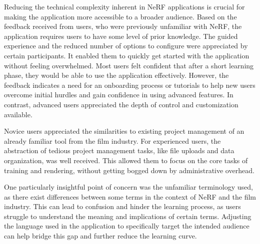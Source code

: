 Reducing the technical complexity inherent in NeRF applications is crucial for making the application more accessible to a broader audience.
Based on the feedback received from users, who were previously unfamiliar with NeRF, the application requires users to have some level of prior knowledge.
The guided experience and the reduced number of options to configure were appreciated by certain participants.
It enabled them to quickly get started with the application without feeling overwhelmed.
Most users felt confident that after a short learning phase, they would be able to use the application effectively.
\cite{P2, P3, P4, P5, P6, P7, P8}
However, the feedback indicates a need for an onboarding process or tutorials to help new users overcome initial hurdles and gain confidence in using advanced features.
In contrast, advanced users appreciated the depth of control and customization available.
\cite{P9, P10}


Novice users appreciated the similarities to existing project management of an already familiar tool from the film industry. 
\cite{P5}
For experienced users, the abstraction of tedious project management tasks, like file uploads and data organization, was well received.
\cite{P1}
This allowed them to focus on the core tasks of training and rendering, without getting bogged down by administrative overhead.


One particularly insightful point of concern was the unfamiliar terminology used, as there exist differences between some terms in the context of NeRF and the film industry. 
\cite{P5}
This can lead to confusion and hinder the learning process, as users struggle to understand the meaning and implications of certain terms.
Adjusting the language used in the application to specifically target the intended audience can help bridge this gap and further reduce the learning curve.


